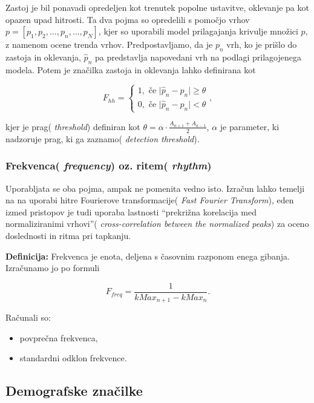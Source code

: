 \documentclass[
]{article}
\providecommand{\tightlist}{%
  \setlength{\itemsep}{0pt}\setlength{\parskip}{0pt}}
\begin{document}
Zastoj je bil ponavadi opredeljen kot trenutek popolne ustavitve,
oklevanje pa kot opazen upad hitrosti. Ta dva pojma so opredelili s
pomočjo vrhov \(p = [p_1, p_2, \dots, p_n, \dots, p_N]\), kjer so
uporabili model prilagajanja krivulje množici \(p\), z namenom ocene
trenda vrhov. Predpostavljamo, da je \(p_n\) vrh, ko je prišlo do
zastoja in oklevanja, \(\hat{p}_n\) pa predstavlja napovedani vrh na
podlagi prilagojenega modela. Potem je značilka zastoja in oklevanja
lahko definirana kot

\[
F_{hh} = \begin{cases}
1, \text{ če } \lvert \hat{p}_n - p_n \lvert \ge \theta \\
0, \text{ če } \lvert \hat{p}_n - p_n \lvert < \theta
\end{cases},
\]

kjer je prag( \emph{threshold}) definiran kot
\(\theta = \alpha \cdot \frac{A_{n+1}+ A_{n-1}}{2}\), \(\alpha\) je
parameter, ki nadzoruje prag, ki ga zaznamo( \emph{detection
threshold}).

\subsubsection{\texorpdfstring{Frekvenca( \emph{frequency}) oz. ritem(
\emph{rhythm})}{Frekvenca( frequency) oz. ritem( rhythm)}}\label{frekvenca-frequency-oz.-ritem-rhythm}

Uporabljata se oba pojma, ampak ne pomenita vedno isto. Izračun lahko
temelji na na uporabi hitre Fourierove transformacije( \emph{Fast
Fourier Transform}), eden izmed pristopov je tudi uporaba lastnosti
``prekrižna korelacija med normaliziranimi vrhovi''(
\emph{cross-correlation between the normalized peaks}) za oceno
doslednosti in ritma pri tapkanju.

\textbf{Definicija:} Frekvenca je enota, deljena s časovnim razponom
enega gibanja. Izračunamo jo po formuli

\[
F_{freq} = \frac{1}{kMax_{n+1} - kMax_{n}}.
\]

Računali so:

\begin{itemize}
\tightlist
\item
  povprečna frekvenca,
\item
  standardni odklon frekvence.
\end{itemize}

\subsection{Demografske značilke}\label{demografske-znaux10dilke}
\end{document}
